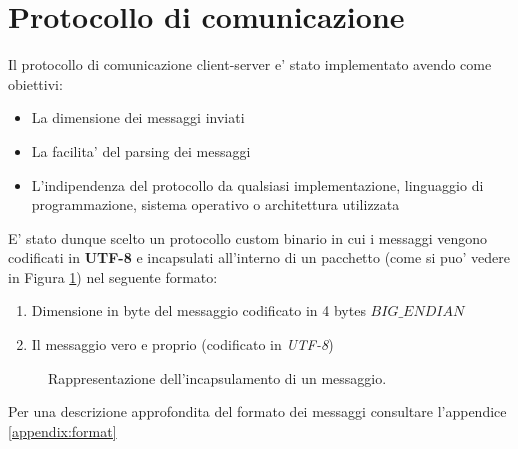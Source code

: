 \section{Protocollo di comunicazione}
Il protocollo di comunicazione client-server e' stato implementato avendo come obiettivi:
\begin{itemize}
	\item La dimensione dei messaggi inviati
	\item La facilita' del parsing dei messaggi
	\item L'indipendenza del protocollo da qualsiasi implementazione, linguaggio di programmazione, sistema operativo o architettura utilizzata
\end{itemize}

\begin{lrbox}{\asciiart}
	\begin{varwidth}{\maxdimen}
		\noindent
	\end{varwidth}
\end{lrbox}%

E' stato dunque scelto un protocollo custom binario in cui i messaggi vengono codificati in \textbf{UTF-8} e incapsulati all'interno di un pacchetto (come si puo' vedere in Figura \ref{fig:proto_fmt1}) nel seguente formato:
\begin{enumerate}
	\item Dimensione in byte del messaggio codificato in 4 bytes $BIG\_ENDIAN$
	\item Il messaggio vero e proprio (codificato in \emph{UTF-8})
\end{enumerate}

\begin{center}
	\begin{figure}[t!]
		\makebox[\textwidth]{\showasciiart{}}
		\caption{Rappresentazione dell'incapsulamento di un messaggio.}
		\label{fig:proto_fmt1}
	\end{figure}
\end{center}

Per una descrizione approfondita del formato dei messaggi consultare l'appendice \ref{appendix:format}